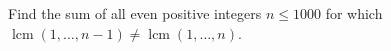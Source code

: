 Find the sum of all even positive integers $n\le1000$ for which $\operatorname{lcm}(1,\ldots,n-1)\ne\operatorname{lcm}(1,\ldots,n)$.
